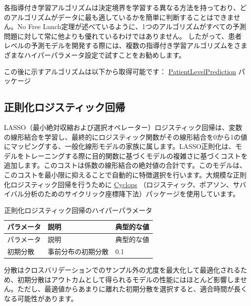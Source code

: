 \documentclass[
  11pt]{book}
\theoremstyle{definition}
\theoremstyle{definition}
\theoremstyle{definition}
\theoremstyle{definition}
\theoremstyle{remark}
\begin{document}
各指導付き学習アルゴリズムは決定境界を学習する異なる方法を持っており、どのアルゴリズムがデータに最も適しているかを簡単に判断することはできません。No Free Lunch定理が述べているように、1つのアルゴリズムがすべての予測問題に対して常に他よりも優れているわけではありません。 したがって、患者レベルの予測モデルを開発する際には、複数の指導付き学習アルゴリズムをさまざまなハイパーパラメータ設定で試すことをお勧めします。

この後に示すアルゴリズムは以下から取得可能です： \href{https://ohdsi.github.io/PatientLevelPrediction/}{PatientLevelPrediction} パッケージ

\subsection{正則化ロジスティック回帰}\label{ux6b63ux5247ux5316ux30edux30b8ux30b9ux30c6ux30a3ux30c3ux30afux56deux5e30}

LASSO（最小絶対収縮および選択オペレーター）ロジスティック回帰は、変数の線形結合を学習し、最終的にロジスティック関数がその線形結合を0から1の値にマッピングする、一般化線形モデルの家族に属します。LASSO正則化は、モデルをトレーニングする際に目的関数に基づくモデルの複雑さに基づくコストを追加します。このコストは係数の線形結合の絶対値の合計です。このモデルは、このコストを最小限に抑えることで自動的に特徴選択を行います。大規模な正則化ロジスティック回帰を行うために \href{https://ohdsi.github.io/Cyclops/}{Cyclops} （ロジスティック、ポアソン、サバイバル分析のためのサイクリック座標降下法）パッケージを使用しています。    

\begin{longtable}[]{@{}lll@{}}
\caption{\label{tab:lassoParameters} 正則化ロジスティック回帰のハイパーパラメータ}\tabularnewline
\toprule\noalign{}
パラメータ & 説明 & 典型的な値 \\
\midrule\noalign{}
\endfirsthead
\toprule\noalign{}
パラメータ & 説明 & 典型的な値 \\
\midrule\noalign{}
\endhead
\bottomrule\noalign{}
\endlastfoot
初期分散 & 事前分布の初期分散 & 0.1 \\
\end{longtable}

分散はクロスバリデーションでのサンプル外の尤度を最大化して最適化されるため、初期分散はアウトカムとして得られるモデルの性能にはほとんど影響しません。ただし、最適値からあまりに離れた初期分散を選択すると、適合時間が長くなる可能性があります。  
\end{document}
